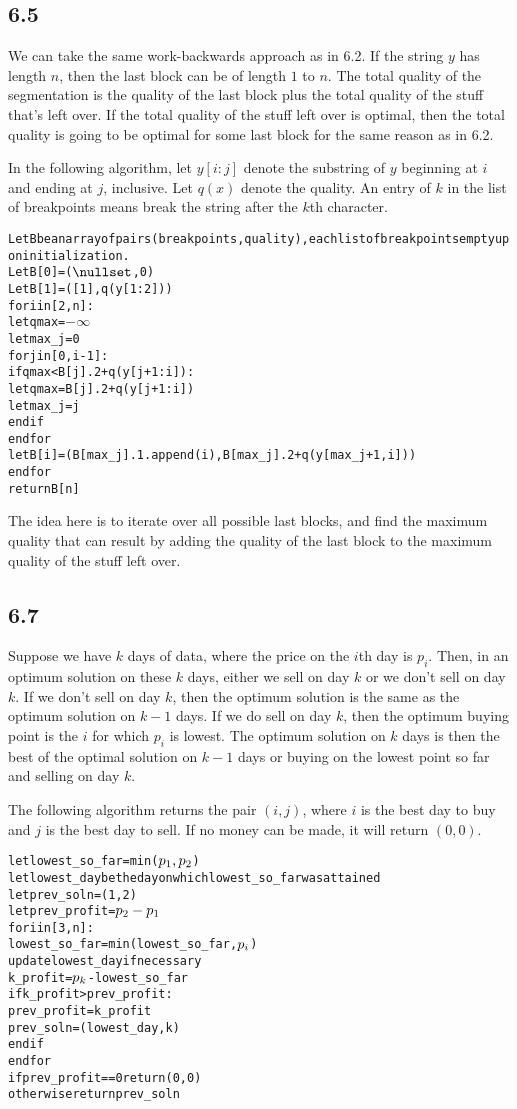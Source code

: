 \documentclass{article}
\begin{document}
\subsection*{6.5}
We can take the same work-backwards approach as in 6.2. If the string $y$ has length $n$, then the last block can be of length $1$ to $n$. The total quality of the segmentation is the quality of the last block plus the total quality of the stuff that's left over. If the total quality of the stuff left over is optimal, then the total quality is going to be optimal for some last block for the same reason as in 6.2. 

In the following algorithm, let $y[i:j]$ denote the substring of $y$ beginning at $i$ and ending at $j$, inclusive. Let $q(x)$ denote the quality. An entry of $k$ in the list of breakpoints means break the string after the $k$th character.

\begin{alltt}
Let B be an array of pairs (breakpoints, quality), each list of breakpoints empty upon initialization.
Let B[0]=(\(\nullset\),0)
Let B[1]=([1],q(y[1:2]))
for i in [2,n]:
    let qmax=\(-\infty\)
    let max_j=0
    for j in [0,i-1]:
        if qmax<B[j].2+q(y[j+1:i]):
            let qmax=B[j].2+q(y[j+1:i])
            let max_j=j
        endif
    endfor
    let B[i]=(B[max_j].1.append(i),B[max_j].2+q(y[max_j+1,i]))
endfor
return B[n]
\end{alltt}

The idea here is to iterate over all possible last blocks, and find the maximum quality that can result by adding the quality of the last block to the maximum quality of the stuff left over.
\subsection*{6.7}
Suppose we have $k$ days of data, where the price on the $i$th day is $p_i$. Then, in an optimum solution on these $k$ days, either we sell on day $k$ or we don't sell on day $k$. If we don't sell on day $k$, then the optimum solution is the same as the optimum solution on $k-1$ days. If we do sell on day $k$, then the optimum buying point is the $i$ for which $p_i$ is lowest. The optimum solution on $k$ days is then the best of the optimal solution on $k-1$ days or buying on the lowest point so far and selling on day $k$.

The following algorithm returns the pair $(i,j)$, where $i$ is the best day to buy and $j$ is the best day to sell. If no money can be made, it will return $(0,0)$.
\begin{alltt}
let lowest_so_far=min(\(p\sb{1},p\sb{2}\))
let lowest_day be the day on which lowest_so_far was attained
let prev_soln=(1,2)
let prev_profit=\(p\sb{2}-p\sb{1}\)
for i in [3,n]:
    lowest_so_far=min(lowest_so_far,\(p\sb{i}\))
    update lowest_day if necessary
    k_profit=\(p\sb{k}\)-lowest_so_far
    if k_profit>prev_profit:
        prev_profit=k_profit
        prev_soln=(lowest_day,k)
    endif
endfor
if prev_profit==0 return (0,0)
otherwise return prev_soln
\end{alltt}
\end{document}

